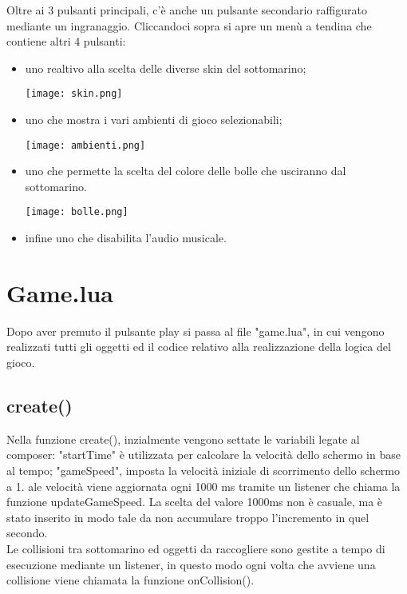 \documentclass[12pt]{article}
\begin{document}
Oltre ai 3 pulsanti principali, c'è anche un pulsante secondario raffigurato mediante un ingranaggio. Cliccandoci sopra si apre un menù a tendina che contiene altri 4 pulsanti:
\begin{itemize}
    \item uno realtivo alla scelta delle diverse skin del sottomarino; 
\begin{center}
    \texttt{[image: skin.png]}\\
\end{center}
    \item uno che mostra i vari ambienti di gioco selezionabili; 

\begin{center}
    \texttt{[image: ambienti.png]}\\
\end{center}


    \item uno che permette la scelta del colore delle bolle che usciranno dal sottomarino. 
\\
\begin{center}
    \texttt{[image: bolle.png]}\\
\end{center}

    \item infine uno che disabilita l'audio musicale. 
\end{itemize}
\section{Game.lua}
Dopo aver premuto il pulsante play si passa al file "game.lua", in cui vengono realizzati tutti gli oggetti ed il codice relativo 
alla realizzazione della logica del gioco. 
\subsection{create()}
Nella funzione create(), inzialmente vengono settate le variabili legate al composer: "startTime" è utilizzata per calcolare la 
velocità dello schermo in base al tempo; "gameSpeed", imposta la velocità iniziale di scorrimento dello schermo a 1. 
ale velocità viene aggiornata ogni 1000 ms tramite un listener che chiama la funzione updateGameSpeed. 
La scelta del valore 1000ms non è casuale, ma è stato inserito in modo tale da non accumulare troppo l'incremento in quel secondo.
\\

Le collisioni tra sottomarino ed oggetti da raccogliere sono gestite a tempo di esecuzione mediante un listener, in questo modo ogni volta che avviene una collisione viene chiamata la funzione onCollision(). 
\\
\end{document}
